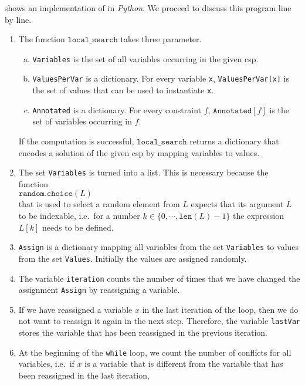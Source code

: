 shows an implementation of  in \textsl{Python}.  We
proceed to discuss this program line by line.
\begin{enumerate}
\item The function $\texttt{local\_search}$ takes three parameter.  
      \begin{enumerate}[(a)]
      \item \texttt{Variables} is the set of all variables occurring in the given \ac{csp}.
      \item \texttt{ValuesPerVar} is a dictionary.  For every variable \texttt{x}, \texttt{ValuesPerVar[x]} is
            the set of values that can be used to instantiate \texttt{x}.
      \item \texttt{Annotated} is a dictionary.  For every constraint $f$, $\texttt{Annotated}[f]$ is the set
            of variables occurring in $f$.
      \end{enumerate}
      If the computation is successful, $\texttt{local\_search}$ returns a dictionary that encodes a solution of the
      given \ac{csp} by mapping variables to values.
\item The set \texttt{Variables} is turned into a list.  This is necessary because the function
      \\[0.2cm]
      \hspace*{1.3cm}
      $\texttt{random.choice}(L)$
      \\[0.2cm]
      that is used to select a random element from $L$ expects that its argument $L$ to be indexable, i.e.~for
      a number $k \in \{0, \cdots, \texttt{len}(L)-1\}$ the expression $L[k]$ needs to be defined.
\item \texttt{Assign} is a dictionary mapping all variables from the set \texttt{Variables} to values from the
      set \texttt{Values}.  Initially the values are assigned randomly.
\item The variable \texttt{iteration} counts the number of times that we have changed the assignment
      \texttt{Assign} by reassigning a variable.
\item If we have reassigned a variable $x$ in the last iteration of the loop, then we do not want to reassign
      it again in the next step.  Therefore, the variable \texttt{lastVar} stores the variable that has been
      reassigned in the previous iteration.
\item At the beginning of the \texttt{while} loop, we count the number of conflicts for all variables, i.e.~if
      $x$ is a variable that is different from the variable that has been reassigned in the last iteration,

\end{enumerate}

